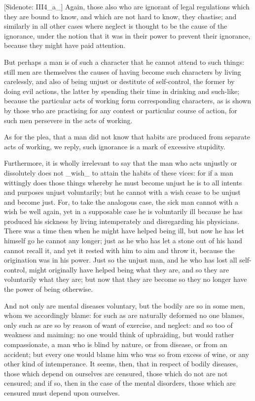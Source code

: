 [Sidenote: III4_a_] Again, those also who are ignorant of legal
regulations which they are bound to know, and which are not hard to
know, they chastise; and similarly in all other cases where neglect is
thought to be the cause of the ignorance, under the notion that it was
in their power to prevent their ignorance, because they might have paid
attention.

But perhaps a man is of such a character that he cannot attend to such
things: still men are themselves the causes of having become such
characters by living carelessly, and also of being unjust or destitute
of self-control, the former by doing evil actions, the latter by
spending their time in drinking and such-like; because the particular
acts of working form corresponding characters, as is shown by those who
are practising for any contest or particular course of action, for such
men persevere in the acts of working.

As for the plea, that a man did not know that habits are produced
from separate acts of working, we reply, such ignorance is a mark of
excessive stupidity.

Furthermore, it is wholly irrelevant to say that the man who acts
unjustly or dissolutely does not _wish_ to attain the habits of these
vices: for if a man wittingly does those things whereby he must become
unjust he is to all intents and purposes unjust voluntarily; but he
cannot with a wish cease to be unjust and become just. For, to take the
analogous case, the sick man cannot with a wish be well again, yet in
a supposable case he is voluntarily ill because he has produced his
sickness by living intemperately and disregarding his physicians. There
was a time then when he might have helped being ill, but now he has let
himself go he cannot any longer; just as he who has let a stone out of
his hand cannot recall it, and yet it rested with him to aim and throw
it, because the origination was in his power. Just so the unjust man,
and he who has lost all self-control, might originally have helped being
what they are, and so they are voluntarily what they are; but now that
they are become so they no longer have the power of being otherwise.

And not only are mental diseases voluntary, but the bodily are so in
some men, whom we accordingly blame: for such as are naturally deformed
no one blames, only such as are so by reason of want of exercise, and
neglect: and so too of weakness and maiming: no one would think of
upbraiding, but would rather compassionate, a man who is blind by
nature, or from disease, or from an accident; but every one would blame
him who was so from excess of wine, or any other kind of intemperance.
It seems, then, that in respect of bodily diseases, those which depend
on ourselves are censured, those which do not are not censured; and if
so, then in the case of the mental disorders, those which are censured
must depend upon ourselves.

